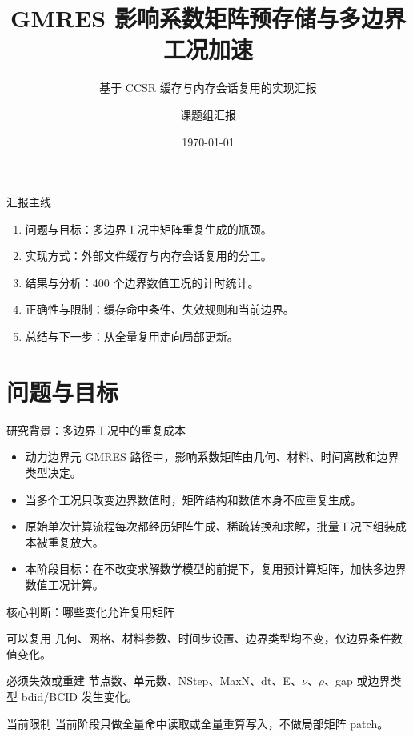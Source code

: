 \documentclass[aspectratio=169,UTF8]{ctexbeamer}
\title{GMRES 影响系数矩阵预存储与多边界工况加速}
\subtitle{基于 CCSR 缓存与内存会话复用的实现汇报}
\author{课题组汇报}
\institute{DBEM 动力边界元程序}
\date{\today}
\begin{document}
\begin{frame}
  \titlepage
\end{frame}

\begin{frame}{汇报主线}
  \begin{enumerate}
    \item 问题与目标：多边界工况中矩阵重复生成的瓶颈。
    \item 实现方式：外部文件缓存与内存会话复用的分工。
    \item 结果与分析：400 个边界数值工况的计时统计。
    \item 正确性与限制：缓存命中条件、失效规则和当前边界。
    \item 总结与下一步：从全量复用走向局部更新。
  \end{enumerate}
\end{frame}

\section{问题与目标}

\begin{frame}{研究背景：多边界工况中的重复成本}
  \begin{itemize}
    \item 动力边界元 GMRES 路径中，影响系数矩阵由几何、材料、时间离散和边界类型决定。
    \item 当多个工况只改变边界数值时，矩阵结构和数值本身不应重复生成。
    \item 原始单次计算流程每次都经历矩阵生成、稀疏转换和求解，批量工况下组装成本被重复放大。
    \item 本阶段目标：在不改变求解数学模型的前提下，复用预计算矩阵，加快多边界数值工况计算。
  \end{itemize}
\end{frame}

\begin{frame}{核心判断：哪些变化允许复用矩阵}
  \begin{block}{可以复用}
    几何、网格、材料参数、时间步设置、边界类型均不变，仅边界条件数值变化。
  \end{block}

  \begin{block}{必须失效或重建}
    节点数、单元数、NStep、MaxN、dt、E、$\nu$、$\rho$、gap 或边界类型 bdid/BCID 发生变化。
  \end{block}

  \begin{alertblock}{当前限制}
    当前阶段只做全量命中读取或全量重算写入，不做局部矩阵 patch。
  \end{alertblock}
\end{frame}
\end{document}
